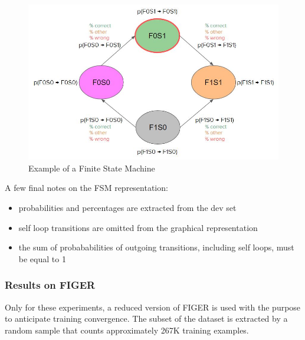 \begin{figure}[H]
    \centering
    \includegraphics[width=.8\linewidth]{figures/fsm_example.jpg}
    \caption{ Example of a Finite State Machine }
    \label{fig:fsm_example}
\end{figure}
A few final notes on the FSM representation:
\begin{itemize}
    \item probabilities and percentages are extracted from the dev set
    \item self loop transitions are omitted from the graphical representation
    \item the sum of probababilities of outgoing transitions, including self loops, must be equal to 1
\end{itemize}

\subsubsection{Results on FIGER}
Only for these experiments, a reduced version of FIGER is used with the purpose to anticipate training convergence. The subset of the dataset is extracted by a random sample that counts approximately 267K training examples.

